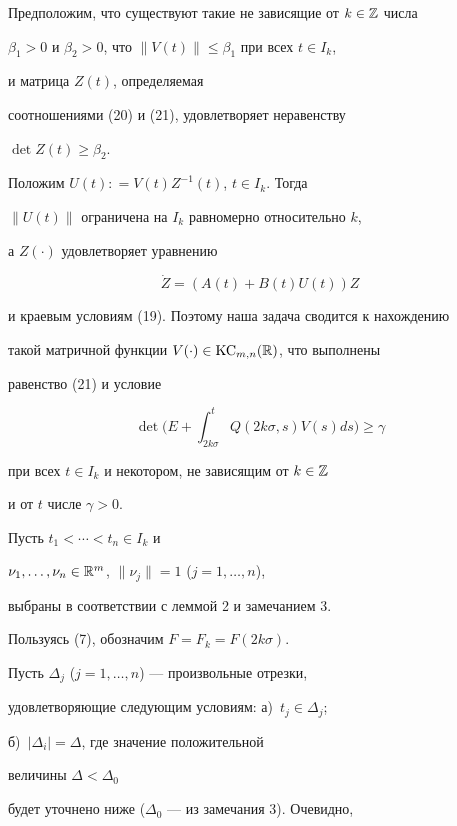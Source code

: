 Предположим, что существуют такие не зависящие от $k\in\Bbb Z$ числа


$\beta_1>0$ и $\beta_2>0$, что $\|V(t)\|\le\beta_1$ при всех $t\in I_k$,


и матрица $Z(t)$, определяемая


соотношениями (20) и (21), удовлетворяет неравенству


$\det Z(t)\ge\beta_2$.


Положим $U(t): =V(t)Z^{-1}(t)$, $t\in I_k$. Тогда


$\|U(t)\|$ ограничена на $I_k$ равномерно относительно $k$,


а $Z(\cdot)$ удовлетворяет уравнению


\begin{equation}


\Dot Z=(A(t)+B(t)U(t))Z


\end{equation}


и краевым условиям (19). Поэтому наша задача сводится к нахождению


такой матричной функции $V(\cdot)\in\operatorname{KC}_{m,n}(\Bbb R)$, что выполнены


равенство (21) и условие


\begin{equation}


\det\bigg(E+\int_{2k\sigma}^{t}Q(2k\sigma,s)V(s)ds\bigg)\ge\gamma


\end{equation}


при всех $t\in I_k$ и некотором, не зависящим от $k\in\Bbb Z$


и от $t$ числе $\gamma>0$.





Пусть $t_{1}<\dotsb<t_{n}\in I_k$ и


$\nu_{1},\dotsc,\nu_{n}\in\Bbb R^m$, $\|\nu_{j}\|=1$ ($j=1,\dotsc,n$),


выбраны в соответствии с леммой 2 и замечанием 3.


Пользуясь (7), обозначим $F=F_k=F(2k\sigma)$.


Пусть $\varDelta_{j}$ ($j=1,\dotsc,n$) --- произвольные отрезки,


удовлетворяющие следующим условиям: а)~$t_{j}\in\varDelta_{j}$;


б)~$|\varDelta_{i}|=\varDelta$, где значение положительной


величины $\varDelta<\varDelta_{0}$


будет уточнено ниже ($\varDelta_0$ --- из замечания 3). Очевидно,


